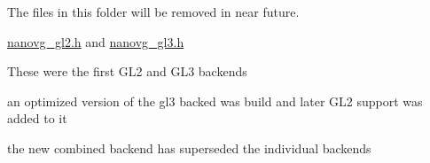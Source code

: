 The files in this folder will be removed in near future.


\begin{DoxyItemize}
\item \mbox{\hyperlink{nanovg__gl2_8h_source}{nanovg\+\_\+gl2.\+h}} and \mbox{\hyperlink{nanovg__gl3_8h_source}{nanovg\+\_\+gl3.\+h}}
\begin{DoxyItemize}
\item These were the first G\+L2 and G\+L3 backends
\item an optimized version of the gl3 backed was build and later G\+L2 support was added to it
\item the new combined backend has superseded the individual backends 
\end{DoxyItemize}
\end{DoxyItemize}